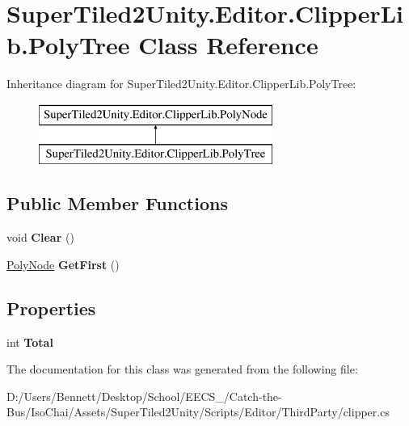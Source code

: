 \hypertarget{class_super_tiled2_unity_1_1_editor_1_1_clipper_lib_1_1_poly_tree}{}\section{Super\+Tiled2\+Unity.\+Editor.\+Clipper\+Lib.\+Poly\+Tree Class Reference}
\label{class_super_tiled2_unity_1_1_editor_1_1_clipper_lib_1_1_poly_tree}
Inheritance diagram for Super\+Tiled2\+Unity.\+Editor.\+Clipper\+Lib.\+Poly\+Tree\+:\begin{figure}[H]
\begin{center}
\leavevmode
\includegraphics[height=2.000000cm]{class_super_tiled2_unity_1_1_editor_1_1_clipper_lib_1_1_poly_tree}
\end{center}
\end{figure}
\subsection*{Public Member Functions}
\begin{DoxyCompactItemize}
\item 
\mbox{\label{class_super_tiled2_unity_1_1_editor_1_1_clipper_lib_1_1_poly_tree_a728e12a2474a355b9bbb9c0af96b8028}} 
void {\bfseries Clear} ()
\item 
\mbox{\label{class_super_tiled2_unity_1_1_editor_1_1_clipper_lib_1_1_poly_tree_a6d19a002de5dc53ffda8d1cc34bf0e5d}} 
\mbox{\hyperlink{class_super_tiled2_unity_1_1_editor_1_1_clipper_lib_1_1_poly_node}{Poly\+Node}} {\bfseries Get\+First} ()
\end{DoxyCompactItemize}
\subsection*{Properties}
\begin{DoxyCompactItemize}
\item 
\mbox{\label{class_super_tiled2_unity_1_1_editor_1_1_clipper_lib_1_1_poly_tree_ac6cf61b97588e10b375c012d46c8fb5e}} 
int {\bfseries Total}
\end{DoxyCompactItemize}


The documentation for this class was generated from the following file\+:\begin{DoxyCompactItemize}
\item 
D\+:/\+Users/\+Bennett/\+Desktop/\+School/\+E\+E\+C\+S\+\_/\+Catch-\/the-\/\+Bus/\+Iso\+Chai/\+Assets/\+Super\+Tiled2\+Unity/\+Scripts/\+Editor/\+Third\+Party/clipper.\+cs\end{DoxyCompactItemize}
